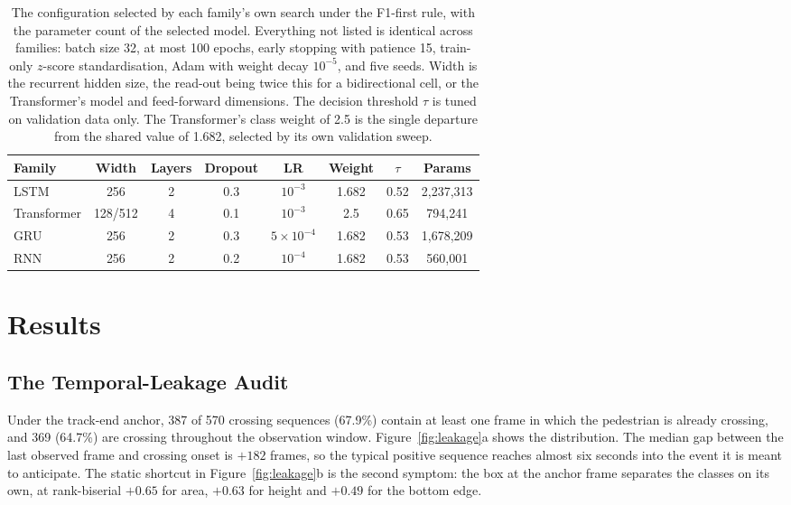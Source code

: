 \documentclass[mti,article,submit,moreauthors]{Definitions/mdpi}
\begin{document}
\begin{table}[H]
\caption{The configuration selected by each family's own search under the F1-first rule, with the parameter count of the selected model. Everything not listed is identical across families: batch size 32, at most 100 epochs, early stopping with patience 15, train-only $z$-score standardisation, Adam with weight decay $10^{-5}$, and five seeds. Width is the recurrent hidden size, the read-out being twice this for a bidirectional cell, or the Transformer's model and feed-forward dimensions. The decision threshold $\tau$ is tuned on validation data only. The Transformer's class weight of 2.5 is the single departure from the shared value of 1.682, selected by its own validation sweep.\label{tab:hparams}}
\begin{tabularx}{\textwidth}{lCCCCCCC}
\toprule
\textbf{Family} & \textbf{Width} & \textbf{Layers} & \textbf{Dropout} & \textbf{LR} & \textbf{Weight} & \textbf{$\tau$} & \textbf{Params}\\
\midrule
LSTM & 256 & 2 & 0.3 & $10^{-3}$ & 1.682 & 0.52 & 2,237,313\\
Transformer & 128/512 & 4 & 0.1 & $10^{-3}$ & 2.5 & 0.65 & 794,241\\
GRU & 256 & 2 & 0.3 & $5\times10^{-4}$ & 1.682 & 0.53 & 1,678,209\\
RNN & 256 & 2 & 0.2 & $10^{-4}$ & 1.682 & 0.53 & 560,001\\
\bottomrule
\end{tabularx}

\end{table}

\section{Results}
\label{sec:results}

\subsection{The Temporal-Leakage Audit}

Under the track-end anchor, 387 of 570 crossing sequences (67.9\%) contain at least one frame in which the pedestrian is already crossing, and 369 (64.7\%) are crossing throughout the observation window. Figure~\ref{fig:leakage}a shows the distribution. The median gap between the last observed frame and crossing onset is $+182$ frames, so the typical positive sequence reaches almost six seconds into the event it is meant to anticipate. The static shortcut in Figure~\ref{fig:leakage}b is the second symptom: the box at the anchor frame separates the classes on its own, at rank-biserial $+0.65$ for area, $+0.63$ for height and $+0.49$ for the bottom edge.
\end{document}
